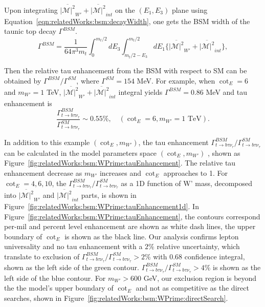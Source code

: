 Upon integrating  $\overline{ |\mathcal{M}|^2 } _{W'} +  \overline{ |\mathcal{M}|^2 } _{int}$ on the $(E_1,E_3)$ plane using Equation~\ref{eqn:relatedWorks:bsm:decayWidth}, one gets the BSM width of the taunic top decay $\Gamma^{BSM}$. 
\begin{equation}
	\Gamma^{BSM} = \frac{1}{64 \pi^3 m_t} \int_{0}^{m_t/2} dE_3 \int_{m_t/2-E_3}^{m_t/2} dE_1  \bigg\{ \overline{ |\mathcal{M}|^2 } _{W'} +  \overline{ |\mathcal{M}|^2}_{int}  \bigg \},
\end{equation}


\noindent Then the relative tau enhancement from the BSM with respect to SM can be obtained by $\Gamma^{BSM}/ \Gamma^{SM}$, where $\Gamma^{SM}=154$ MeV. For example, when $\cot_E=6$  and $m_{W'}=1$ TeV, $\overline{ |\mathcal{M}|^2 } _{W'} +  \overline{ |\mathcal{M}|^2 } _{int}$ integral yields $\Gamma^{BSM} = 0.86 $ MeV and tau enhancement is
\begin{equation}
	\frac{ \Gamma_{t\to b \tau \nu_\tau}^{BSM} }{ \Gamma_{t\to b \tau \nu_\tau}^{SM} } \sim 0.55 \%, \quad (\cot_E=6, m_{W'}=1 \text{ TeV}).
\end{equation}

\noindent In addition to this example $(\cot_E, m_{W'})$, the tau enhancement $ \Gamma_{t\to b \tau \nu_\tau}^{BSM} / \Gamma_{t\to b \tau \nu_\tau}^{SM} $ can be calculated in the model parameters space $(\cot_E, m_{W'})$ , shown as Figure~\ref{fig:relatedWorks:bsm:WPrime:tauEnhancement}. The relative tau enhancement decrease as $m_{W'}$ increases and $\cot_E$ approaches to 1. For $\cot_E=4,6,10$, the $\Gamma_{t\to b \tau \nu_\tau}^{BSM}/  \Gamma_{t\to b \tau \nu_\tau}^{SM} $ as a 1D function of W' mass, decomposed into $\overline{ |\mathcal{M}|^2 } _{W'} $ and $\overline{ |\mathcal{M}|^2 } _{int}$  parts, is shown in Figure~\ref{fig:relatedWorks:bsm:WPrime:tauEnhancement1d}. In Figure~\ref{fig:relatedWorks:bsm:WPrime:tauEnhancement}, the contours correspond per-mil and percent level enhancement are shown as white dash lines, the upper boundary of $\cot_E$ is shown as the black line. Our analysis confirms lepton universality and no tau enhancement with a $2\%$ relative uncertainty, which translate to exclusion of $ \Gamma_{t\to b \tau \nu_\tau}^{BSM} / \Gamma_{t\to b \tau \nu_\tau}^{SM} >  2\%$ with 0.68 confidence integral, shown as the left side of the green contour. $ \Gamma_{t\to b \tau \nu_\tau}^{BSM} / \Gamma_{t\to b \tau \nu_\tau}^{SM} >  4\%$ is shown as the left side of the blue contour. For $m_{W'}>600$ GeV, our exclusion region is beyond the the model's upper boundary of $\cot_E$ and not as competitive as the direct searches, shown in Figure~\ref{fig:relatedWorks:bsm:WPrime:directSearch}.




